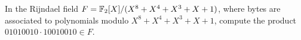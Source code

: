 \begin{problem}
In the Rijndael field $F=\mathbb{F}_2[X]/(X^8+X^4+X^3+X+1)$, where bytes are associated to polynomials modulo $X^8+X^4+X^3+X+1$, compute the product $01010010 \cdot 10010010 \in F$.
\end{problem}
